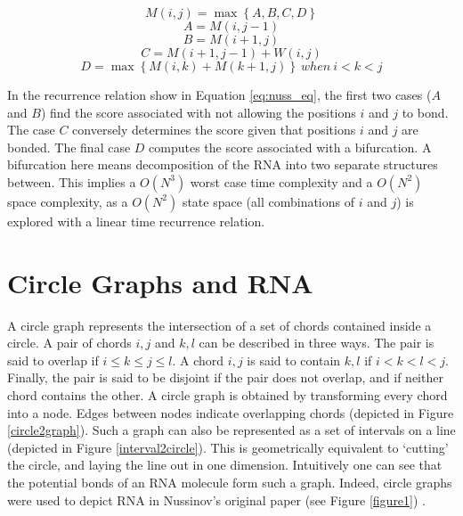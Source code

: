 \documentclass[12pt, a4paper]{article}
\begin{document}
\begin{equation} \label{eq:nuss_eq}
	M(i, j) = \max \left\lbrace A, B, C, D \right\rbrace 
\end{equation}
\[
A = M(i, j-1)
\]
\[
B = M(i+1, j)
\]
\[
C = M(i+1, j-1) + W(i, j)
\]
\[
D = \max \left\lbrace M(i, k) + M(k+1, j) \right\rbrace \: when \: i < k < j
\]


In the recurrence relation show in Equation \ref{eq:nuss_eq}, the first two cases ($A$ and $B$) find the score associated with not allowing the positions $i$ and $j$ to bond. The case $C$ conversely determines the score given that positions $i$ and $j$ are bonded. The final case $D$ computes the score associated with a bifurcation. A bifurcation here means decomposition of the RNA into two separate structures between. This implies a $O(N^3)$
worst case time complexity and a $O(N^2)$ space complexity, as a $O(N^2)$ state space (all combinations of $i$ and $j$) is explored
with a linear time recurrence relation.



\section*{Circle Graphs and RNA}
A circle graph represents the intersection of a set of chords contained inside a circle.
A pair of chords $i, j$ and $k, l$ can be described in three ways. The pair is said to overlap if $i \leq k \leq j \leq l$. A chord $i, j$ is said to contain $k, l$ if $i < k < l < j$. Finally, the pair is said to be disjoint if the pair does not overlap, and if neither chord contains the other. A circle graph is obtained by transforming every chord into a node. Edges between nodes indicate overlapping chords (depicted in Figure \ref{circle2graph}). Such a graph can also be represented as a set of intervals on a line (depicted in Figure \ref{interval2circle}). This is geometrically equivalent to `cutting' the circle, and laying the line out in one dimension. Intuitively one can see that the potential bonds of an RNA molecule form such a graph. Indeed, circle graphs were used to depict RNA in Nussinov's original paper (see Figure \ref{figure1}) \cite{nussinov1980fast}.
\end{document}
